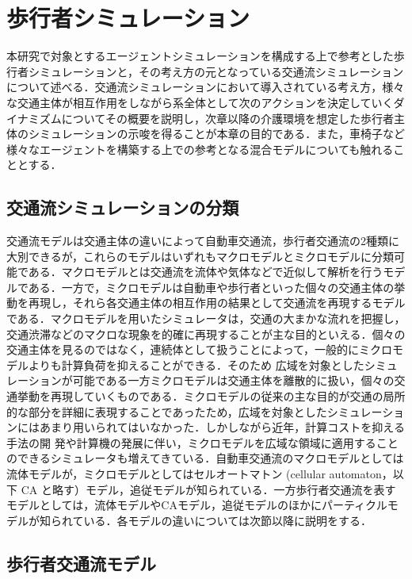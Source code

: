 \chapter{歩行者シミュレーション}

本研究で対象とするエージェントシミュレーションを構成する上で参考とした歩行者シミュレーションと，その考え方の元となっている交通流シミュレーションについて述べる．交通流シミュレーションにおいて導入されている考え方，様々な交通主体が相互作用をしながら系全体として次のアクションを決定していくダイナミズムについてその概要を説明し，次章以降の介護環境を想定した歩行者主体のシミュレーションの示唆を得ることが本章の目的である．また，車椅子など様々なエージェントを構築する上での参考となる混合モデルについても触れることとする．

\section{交通流シミュレーションの分類}

交通流モデルは交通主体の違いによって自動車交通流，歩行者交通流の2種類に大別できるが，これらのモデルはいずれもマクロモデルとミクロモデルに分類可能である．マクロモデルとは交通流を流体や気体などで近似して解析を行うモデルである．一方で，ミクロモデルは自動車や歩行者といった個々の交通主体の挙動を再現し，それら各交通主体の相互作用の結果として交通流を再現するモデルである．マクロモデルを用いたシミュレータは，交通の大まかな流れを把握し，交通渋滞などのマクロな現象を的確に再現することが主な目的といえる．個々の交通主体を見るのではなく，連続体として扱うことによって，一般的にミクロモデルよりも計算負荷を抑えることができる．そのため 広域を対象としたシミュレーションが可能である一方ミクロモデルは交通主体を離散的に扱い，個々の交通挙動を再現していくものである．ミクロモデルの従来の主な目的が交通の局所的な部分を詳細に表現することであったため，広域を対象としたシミュレーションにはあまり用いられてはいなかった．しかしながら近年，計算コストを抑える手法の開 発や計算機の発展に伴い，ミクロモデルを広域な領域に適用することのできるシミュレータも増えてきている．自動車交通流のマクロモデルとしては流体モデルが，ミクロモデルとしてはセルオートマトン (cellular automaton，以下 CA と略す）モデル，追従モデルが知られている．一方歩行者交通流を表すモデルとしては，流体モデルやCAモデル，追従モデルのほかにパーティクルモデルが知られている．各モデルの違いについては次節以降に説明をする．

\section{歩行者交通流モデル}


